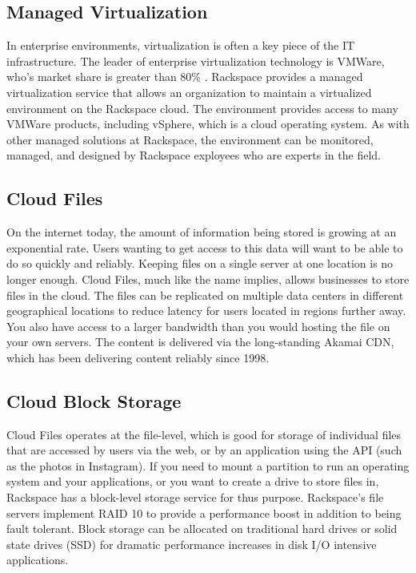 \documentclass[DIV=calc, paper=letter, fontsize=12pt, twocolumn]{scrartcl}	 %
\begin{document}
\subsection*{Managed Virtualization}

In enterprise environments, virtualization is often a key piece of the IT
infrastructure. The leader of enterprise virtualization technology is 
VMWare, who's market share is greater than 80\% \cite{ref:vmware}. Rackspace
provides a managed virtualization service that allows an organization to
maintain a virtualized environment on the Rackspace cloud. The environment 
provides access to many VMWare products, including vSphere, which is a
cloud operating system. As with other managed solutions at Rackspace, 
the environment can be monitored, managed, and designed by Rackspace 
exployees who are experts in the field.

\subsection*{Cloud Files}

On the internet today, the amount of information being stored is growing
at an exponential rate. Users wanting to get access to this data will
want to be able to do so quickly and reliably. Keeping files on a single
server at one location is no longer enough. Cloud Files, much like the
name implies, allows businesses to store files in the cloud. The files
can be replicated on multiple data centers in different geographical
locations to reduce latency for users located in regions further away.
You also have access to a larger bandwidth than you would hosting
the file on your own servers. The content is delivered via the long-standing
Akamai CDN, which has been delivering content reliably since 1998.

\subsection*{Cloud Block Storage}

Cloud Files operates at the file-level, which is good for storage of
individual files that are accessed by users via the web, or by an
application using the API (such as the photos in Instagram). If you need to
mount a partition to run an operating system and your applications, 
or you want to create a drive to store files in, Rackspace has a block-level
storage service for thus purpose. Rackspace's file servers implement RAID
10 to provide a performance boost in addition to being fault tolerant.
Block storage can be allocated on traditional hard drives or solid state
drives (SSD) for dramatic performance increases in disk I/O intensive
applications.
\end{document}
